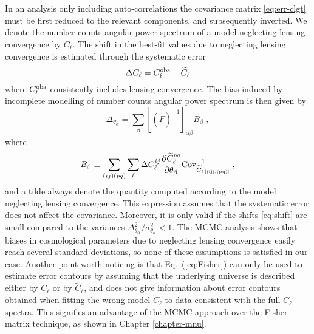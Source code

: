 In an analysis only including auto-correlations the covariance matrix \eqref{eq:err-clgt} must be first reduced to the relevant components, and subsequently inverted. We denote the number counts angular power spectrum of a model neglecting lensing convergence by $\widetilde{C}_{\ell}$. The shift in the best-fit values due to neglecting lensing convergence is estimated through the systematic error \cite{Knox:1998fp,Heavens:2007ka,Kitching:2008eq,Camera:2014sba}
\begin{equation}
\Delta C_{\ell}=C^{\mathrm{obs}}_{\ell}-\widetilde{C}_{\ell}
\end{equation}  
where $C^{\mathrm{obs}}_{\ell}$ consistently includes lensing convergence. The bias induced by incomplete modelling of number counts angular power spectrum is then given by
\begin{equation}
\label{eq:shift}
\Delta_{\theta_{\alpha}}=\sum_{\beta} \left[\left(\widetilde{F}\right)^{-1}\right]_{\alpha\beta} B_{\beta} \;,
\end{equation}
where
\begin{equation}
B_{\beta} \equiv \sum_{(ij)(pq)} \sum_{\ell} \Delta C_{\ell}^{ ij} \frac{\partial \widetilde{C}_{\ell}^{pq}}{\partial \theta_{\beta}} {\rm Cov}_{\widetilde{C}_{\ell \, \rm[(ij), (pq)]}}^{-1} \;,
\end{equation}
and a tilde always denote the quantity computed according to the model neglecting lensing convergence.
This expression assumes that the systematic error does not affect the covariance. Moreover, it is only valid if the shifts \eqref{eq:shift} are small compared to the variances $\Delta^2_{\theta_{\alpha}}/\sigma^2_{\theta_{\alpha}}<1$.
The MCMC analysis shows that biases in cosmological parameters due to neglecting lensing convergence easily reach several standard deviations, so none of these assumptions is satisfied in our case.
Another point worth noticing is that Eq.~(\ref{eq:Fisher}) can only be used to estimate error contours by assuming that the underlying universe is described either by $C_{\ell}$ or by $\tilde{C}_{\ell}$, and does not give information about error contours obtained when  fitting the wrong model $\tilde{C}_{\ell}$ to data consistent with the full $C_{\ell}$ spectra. This signifies an advantage of the MCMC approach over the Fisher matrix technique, as shown in Chapter \ref{chapter-mnu}.

